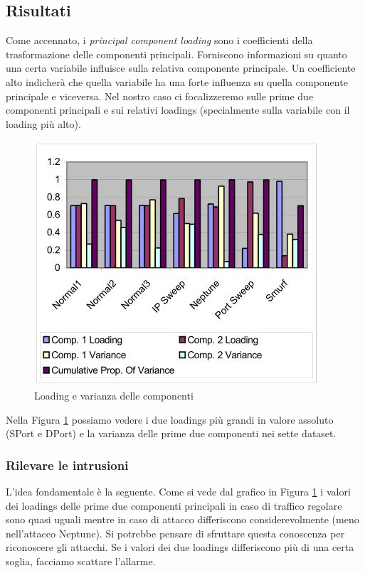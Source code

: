 \documentclass[12pt]{article}
\begin{document}
	\subsection{Risultati}
		Come accennato, i \emph{principal component loading} sono i coefficienti della trasformazione delle componenti principali. Forniscono informazioni su quanto una certa variabile influisce sulla relativa componente principale. Un coefficiente alto indicherà che quella variabile ha una forte influenza su quella componente principale e viceversa. Nel nostro caso ci focalizzeremo sulle prime due componenti principali e sui relativi loadings (specialmente sulla variabile con il loading più alto).
		\begin{figure}
			\begin{center}
				\includegraphics[scale=.8]{grafico}
				\caption{Loading e varianza delle componenti}
				\label{fig:grafico}
			\end{center}
		\end{figure}
		Nella Figura \ref{fig:grafico} possiamo vedere i due loadings più grandi in valore assoluto (SPort e DPort) e la varianza delle prime due componenti nei sette dataset.
		
		\subsubsection{Rilevare le intrusioni}
			L'idea fondamentale è la seguente. Come si vede dal grafico in Figura \ref{fig:grafico} i valori dei loadings delle prime due componenti principali in caso di traffico regolare sono quasi uguali mentre in caso di attacco differiscono considerevolmente (meno nell'attacco Neptune). Si potrebbe pensare di sfruttare questa conoscenza per riconoscere gli attacchi. Se i valori dei due loadings differiscono più di una certa soglia, facciamo scattare l'allarme. 
			
\end{document}
